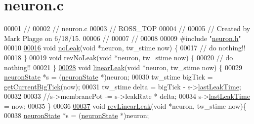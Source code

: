\hypertarget{neuron_8c_source}{}\section{neuron.\+c}
\label{neuron_8c_source}

\begin{DoxyCode}
00001 \textcolor{comment}{//}
00002 \textcolor{comment}{//  neuron.c}
00003 \textcolor{comment}{//  ROSS\_TOP}
00004 \textcolor{comment}{//}
00005 \textcolor{comment}{//  Created by Mark Plagge on 6/18/15.}
00006 \textcolor{comment}{//}
00007 \textcolor{comment}{//}
00008 
00009 \textcolor{preprocessor}{#include "\hyperlink{neuron_8h}{neuron.h}"}
00010 
\hypertarget{neuron_8c_source_l00016}{}\hyperlink{neuron_8h_a8e52befc10f975c6be39cc93af573d7e}{00016} \textcolor{keywordtype}{void} \hyperlink{neuron_8c_a8e52befc10f975c6be39cc93af573d7e}{noLeak}(\textcolor{keywordtype}{void} *neuron, tw\_stime now) \{
00017   \textcolor{comment}{// do nothing!!}
00018 \}
\hypertarget{neuron_8c_source_l00019}{}\hyperlink{neuron_8h_ac5bebec77c5216533ec5f6acd086532e}{00019} \textcolor{keywordtype}{void} \hyperlink{neuron_8c_ac5bebec77c5216533ec5f6acd086532e}{revNoLeak}(\textcolor{keywordtype}{void} *neuron, tw\_stime now) \{
00020   \textcolor{comment}{// do nothing!!}
00021 \}
\hypertarget{neuron_8c_source_l00028}{}\hyperlink{neuron_8h_a64dc379b459a2b07b40bce35381210e8}{00028} \textcolor{keywordtype}{void} \hyperlink{neuron_8c_a64dc379b459a2b07b40bce35381210e8}{linearLeak}(\textcolor{keywordtype}{void} *neuron, tw\_stime now) \{
00029     \hyperlink{structneuron_state}{neuronState} *s = (\hyperlink{structneuron_state}{neuronState} *)neuron;
00030     tw\_stime bigTick = \hyperlink{assist_8c_a4d378196b7fceed090d64ec8820b4065}{getCurrentBigTick}(now);
00031     tw\_stime delta = bigTick - s->\hyperlink{structneuron_state_a6f4e4d8fc1cf0257b486e01f628d2656}{lastLeakTime};
00032 
00033         \textcolor{comment}{//s->membranePot -= s->leakRate * delta;}
00034     s->\hyperlink{structneuron_state_a6f4e4d8fc1cf0257b486e01f628d2656}{lastLeakTime} = now;
00035 \}
00036 
\hypertarget{neuron_8c_source_l00037}{}\hyperlink{neuron_8h_a26ced40d7ad7a0b448a136d8724fe18b}{00037} \textcolor{keywordtype}{void} \hyperlink{neuron_8c_a26ced40d7ad7a0b448a136d8724fe18b}{revLinearLeak}(\textcolor{keywordtype}{void} *neuron, tw\_stime now)\{
00038     \hyperlink{structneuron_state}{neuronState} *s = (\hyperlink{structneuron_state}{neuronState} *)neuron;

\end{DoxyCode}
